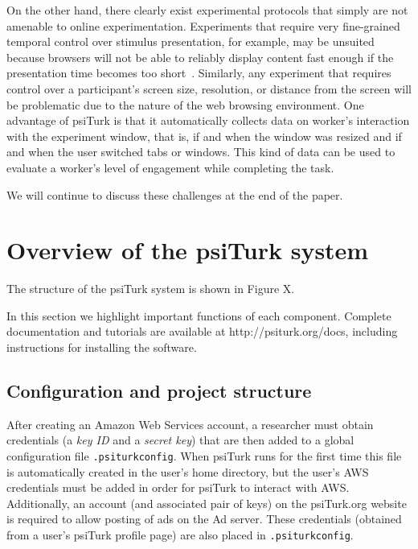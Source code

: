\documentclass[twocolumn]{svjour3}          %
\begin{document}
On the other hand, there clearly exist experimental protocols that simply are not amenable to online
experimentation. Experiments that require very fine-grained temporal control over stimulus presentation, for example, 
may be unsuited because browsers will not be able to reliably display content fast enough if the presentation time
becomes too short~\citep{crump2013evaluating}.
Similarly, any experiment that requires control over a participant's screen size, resolution, or distance from the screen will be problematic due to the nature of the web browsing environment.
One advantage of psiTurk is that
it automatically collects data on worker's interaction with the experiment window, that is, if and when the window was resized and
if and when the user switched tabs or windows. 
This kind of data can be used to evaluate a worker's level of engagement while completing the task.

We will continue to discuss these challenges at the end of the paper.





\section{Overview of the psiTurk system}

The structure of the psiTurk system is shown in Figure X.

In this section we highlight important functions of each component.
Complete documentation and tutorials are available at http://psiturk.org/docs, including instructions for installing the software.

\subsection{Configuration and project structure}

After creating an Amazon Web Services account, a researcher must obtain credentials (a \emph{key ID} and a \emph{secret key}) that are then added to a global configuration file \texttt{.psiturkconfig}.
When psiTurk runs for the first time this file is automatically created in the user's home directory, but the user's AWS credentials must be added in order for psiTurk to interact with AWS.
Additionally, an account (and associated pair of keys) on the psiTurk.org website is required to allow posting of ads on the Ad server.
These credentials (obtained from a user's psiTurk profile page) are also placed in \texttt{.psiturkconfig}.
\end{document}
